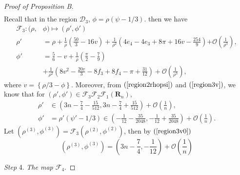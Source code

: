 \documentclass{article}
\numberwithin{figure}{section}
\numberwithin{equation}{section}
\theoremstyle{remark}
\theoremstyle{definition}
\begin{document}
\begin{proof}[Proof of Proposition B]
\begin{equation}
\begin{split}
		\end{split}
	\end{equation}
    Recall that in the region $\mathcal{D}_3$, $\phi=\rho(\psi-1/3)$. then we have
       \begin{equation}\label{F3}
		\begin{split}
        \mathcal{F}_3:(\rho,&\phi)\mapsto(\rho',\phi')\\
			\rho' &= \rho + \frac{1}{\rho}\left(\frac{50}{3}-16v\right) + \frac{1}{\rho^{2}}\left(4e_4-4e_3+8\pi+16v-\frac{254}{9}\right)\mathcal{+ O}\left( \frac{1}{\rho^{3}} \right),\\
			\phi'& = \frac{5}{6} - v + \frac{1}{\rho}\left(\frac{\pi}{2}-\frac{7}{9}\right) \\
            &+ \frac{1}{\rho^{2}}\left(8v^2 -\frac{20v}{3}-8f_3 +8f_4 -\pi +\frac{31}{12}\right) + \mathcal{O}\left( \frac{1}{\rho^{3}} \right),
		\end{split}
	\end{equation}
       where $v=\left\{\rho/3-\phi\right\}$. Moreover, from $(\ref{region2rhopsi})$ and $(\ref{region3v})$, we know that for $(\rho',\phi')\in\mathcal{F}_3\mathcal{F}_2\mathcal{F}_1(\mathbf{R}_n)$,
       \begin{equation}\label{region3rhopsi}
       \begin{split}
           \rho'&\in\left(3n-\frac{7}{4}-\frac{15}{512},3n-\frac{7}{4}+\frac{15}{512}\right)+\mathcal{O}\left(\frac{1}{n}\right),\\
             \phi'&=\rho'(\psi'-1/3)\in\left(-\frac{1}{12}-\frac{35}{2048},-\frac{1}{12}+\frac{35}{2048}\right)+\mathcal{O}\left(\frac{1}{n}\right).
        \end{split}
       \end{equation}
        Let $(\rho^{(3)},\phi^{(3)})=\mathcal{F}_3(\rho^{(2)},\phi^{(2)})$, then by $(\ref{region3v0})$
       \begin{equation}\label{fixpoint 3}
           (\rho^{(3)},\phi^{(3)})=\left(3n-\frac{7}{4},-\frac{1}{12}\right)+\mathcal{O}\left(\frac{1}{n}\right)
       \end{equation}
       
       \emph{Step} 4. \emph{The map $\mathcal{F}_4$}.
       

\end{proof}
\end{document}
